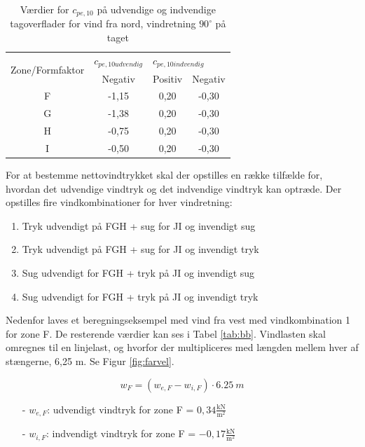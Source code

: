 \begin{table}[htb]
	\begin{center}
		\begin{tabular}{ c c c c } 
			\hline
			\multirow{2}{*}{Zone/Formfaktor} & $c_{pe,10 udvendig}$ & \multicolumn{2}{l}{$c_{pe,10 indvendig}$} \\	
			& Negativ & Positiv & Negativ \\ \hline
			F & -1,15 & 0,20 & -0,30 \\	
			G & -1,38 & 0,20 & -0,30 \\ 
			H & -0,75 & 0,20 & -0,30 \\ 
			I & -0,50 & 0,20 & -0,30 \\	
		\end{tabular}
		\caption{Værdier for $c_{pe,10}$ på udvendige og indvendige tagoverflader for vind fra nord, vindretning $90^{\circ}$ på taget}
		\label{tab:kk}
	\end{center}
\end{table}

For at bestemme nettovindtrykket skal der opstilles en række tilfælde for, hvordan det udvendige vindtryk og det indvendige vindtryk kan optræde.  
\newline
\newline
Der opstilles fire vindkombinationer for hver vindretning:
\begin{enumerate}
	\item Tryk udvendigt på FGH + sug for JI og invendigt sug
	\item Tryk udvendigt på FGH + sug for JI og invendigt tryk
	\item Sug udvendigt for FGH + tryk på JI og invendigt sug
	\item Sug udvendigt for FGH + tryk på JI og invendigt tryk
\end{enumerate}

Nedenfor laves et beregningseksempel med vind fra vest med vindkombination 1 for zone F. De resterende værdier kan ses i Tabel \ref{tab:bb}.
\newline
\newline
Vindlasten skal omregnes til en linjelast, og hvorfor der multipliceres med længden mellem hver af stængerne, 6,25 m. Se Figur \ref{fig:farvel}.

\begin{equation} 
	w_F = (w_{e,F}-w_{i,F})\cdot \SI{6,25}{m}
\end{equation}

\begin{itemize}
	\item[-] $w_{e,F}$: udvendigt vindtryk for zone F = $0,\!34 \frac{\text{kN}}{\text{m}^2}$
	\item[-] $w_{i,F}$: indvendigt vindtryk for zone F = $-0,\!17 \frac{\text{kN}}{\text{m}^2}$
\end{itemize}

